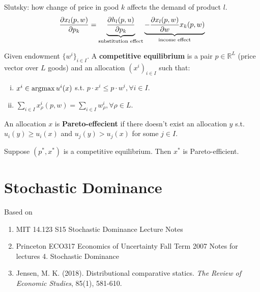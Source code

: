 \documentclass[11pt]{elegantbook}
\newcommand{\argmax}{\operatornamewithlimits{argmax}}
\begin{document}
Slutsky: how change of price in good $k$ affects the demand of product $l$.
\begin{equation}
    \begin{aligned}
        \frac{\partial x_l(p,w)}{\partial p_k}=\underbrace{\frac{\partial h_l(p,u)}{\partial p_k}}_{\textnormal{substitution effect}}\underbrace{-\frac{\partial x_l(p,w)}{\partial w} x_k(p,w)}_{\textnormal{income effect}}
    \end{aligned}
    \nonumber
\end{equation}

\begin{definition}
    \normalfont
    Given endowment $\{w^i\}_{i\in I}$. A \textbf{competitive equilibrium} is a pair $p\in \mathbb{R}^L$ (price vector over $L$ goods) and an allocation $(x^i)_{i\in I}$ such that:
    \begin{enumerate}[(i).]
        \item $x^i\in \argmax u^i(x)$ s.t. $p\cdot x^i\leq p\cdot w^i, \forall i\in I$.
        \item $\sum_{i\in I}x^i_\rho (p,w)=\sum_{i\in I}w^i_\rho, \forall \rho\in L$.
    \end{enumerate}
\end{definition}

\begin{definition}
    \normalfont
    An allocation $x$ is \textbf{Pareto-effecient} if there doesn't exist an allocation $y$ s.t. $u_i(y)\geq u_i(x)$ and $u_j(y)> u_j(x)$ for some $j\in I$.
\end{definition}


\begin{theorem}
    Suppose $(p^*,x^*)$ is a competitive equilibrium. Then $x^*$ is Pareto-efficient.
\end{theorem}



\chapter{Stochastic Dominance}
Based on
\begin{enumerate}[$\circ$]
    \item MIT 14.123 S15 Stochastic Dominance Lecture Notes
    \item Princeton ECO317 Economics of Uncertainty Fall Term 2007 Notes for lectures 4. Stochastic Dominance
    \item Jensen, M. K. (2018). Distributional comparative statics. \textit{The Review of Economic Studies}, 85(1), 581-610.
\end{enumerate}
\end{document}
